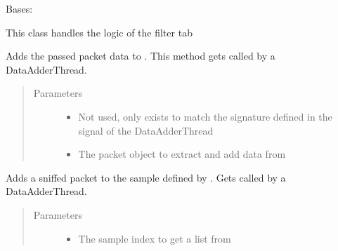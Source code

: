 \documentclass[letterpaper,10pt,english]{sphinxmanual}
\begin{document}
\begin{fulllineitems}
\label{\detokenize{src:src.FilterTab.FilterTab}}
Bases: {\hyperref[\detokenize{src:src.AbstractTab.AbstractTab}]{}}

This class handles the logic of the filter tab

\begin{fulllineitems}
\label{\detokenize{src:src.FilterTab.FilterTab.__init__}}
\end{fulllineitems}


\begin{fulllineitems}
\label{\detokenize{src:src.FilterTab.FilterTab.addSniffedNoise}}
Adds the passed packet data to .
This method gets called by a DataAdderThread.
\begin{quote}\begin{description}
\item[{Parameters}] \leavevmode\begin{itemize}
\item {} 
 \textendash{} Not used, only exists to match the signature defined in the signal of the DataAdderThread

\item {} 
 \textendash{} The packet object to extract and add data from

\end{itemize}

\end{description}\end{quote}

\end{fulllineitems}


\begin{fulllineitems}
\label{\detokenize{src:src.FilterTab.FilterTab.addSniffedPacketToSample}}
Adds a sniffed packet to the sample defined by .
Gets called by a DataAdderThread.
\begin{quote}\begin{description}
\item[{Parameters}] \leavevmode\begin{itemize}
\item {} 
 \textendash{} The sample index to get a list from 


\end{itemize}
\end{description}
\end{quote}
\end{fulllineitems}
\end{fulllineitems}
\end{document}
